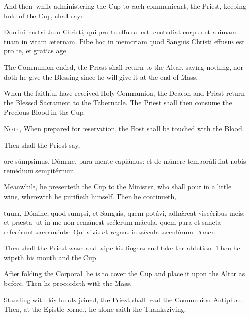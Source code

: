 \begin{rubric}
    And then, while administering the Cup to each communicant, the Priest, keeping hold of the Cup, shall say:
\end{rubric}
 Domini nostri Jesu Christi, qui pro te effusus est, custodiat corpus et animam tuam in vitam æternam. Bibe hoc in memoriam quod Sanguis Christi effusus est pro te, et gratias age.
\begin{rubric}
    The Communion ended, the Priest shall return to the Altar, saying nothing, nor doth he give the Blessing since he will give it at the end of Mass.    
\end{rubric}
\begin{rubric}
    When the faithful have received Holy Communion, the Deacon and Priest return the Blessed Sacrament to the Tabernacle. The Priest shall then consume the Precious Blood in the Cup.\par
    \textsc{Note,} When prepared for reservation, the Host shall be touched with the Blood.
\end{rubric}
\begin{rubric}
    Then shall the Priest say,
\end{rubric}
 ore súmpsimus, Dómine, pura mente capiámus: et de múnere temporáli fiat nobis remédium sempitérnum.
\begin{rubric}
    Meanwhile, he presenteth the Cup to the Minister, who shall pour in a little wine, wherewith he purifieth himself. Then he continueth,    
\end{rubric}
 tuum, Dómine, quod sumpsi, et Sanguis, quem potávi, adhǽreat viscéribus meis: et præsta; ut in me non remáneat scélerum mácula, quem pura et sancta refecérunt sacraménta: Qui vivis et regnas in sǽcula sæculórum. Amen.
\begin{rubric}
    Then shall the Priest wash and wipe his fingers and take the ablution. Then he wipeth his mouth and the Cup.
\end{rubric}
\begin{rubric}
	After folding the Corporal, he is to cover the Cup and place it upon the Altar as before. Then he proceedeth with the Mass.
\end{rubric}
\begin{rubric}
    Standing with his hands joined, the Priest shall read the Communion Antiphon. Then, at the Epistle corner, he alone saith the Thanksgiving.
\end{rubric}
\oremuslatin
